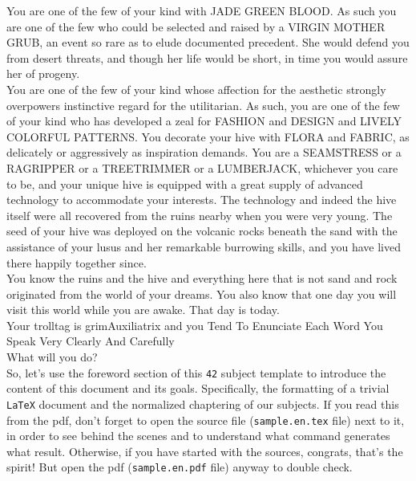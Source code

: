 \documentclass{42-en}
\begin{document}
    You are one of the few of your kind with JADE GREEN BLOOD.
    As such you are one of the few who could be selected and raised by a VIRGIN MOTHER GRUB,
    an event so rare as to elude documented precedent.
    She would defend you from desert threats,
    and though her life would be short,
    in time you would assure her of progeny.\\

    You are one of the few of your kind whose affection for the aesthetic strongly overpowers
    instinctive regard for the utilitarian.
    As such, you are one of the few of your kind who has developed a zeal for FASHION and DESIGN and LIVELY COLORFUL PATTERNS.
    You decorate your hive with FLORA and FABRIC, as delicately or aggressively as inspiration demands.
    You are a SEAMSTRESS or a RAGRIPPER or a TREETRIMMER or a LUMBERJACK, whichever you care to be,
    and your unique hive is equipped with a great supply of advanced technology to accommodate your interests.
    The technology and indeed the hive itself were all recovered from the ruins nearby when you were very young.
    The seed of your hive was deployed on the volcanic rocks beneath the sand with the assistance of your lusus
    and her remarkable burrowing skills, and you have lived there happily together since.\\

    You know the ruins and the hive and everything here that is not sand and rock originated from the world of your dreams.
    You also know that one day you will visit this world while you are awake. That day is today.\\

    Your trolltag is grimAuxiliatrix and you Tend To Enunciate Each Word You Speak Very Clearly And Carefully\\

    What will you do?\\

    So, let's use the foreword section of this \texttt{42} subject
    template to introduce the content of this document and
    its goals.
    Specifically, the formatting of a trivial
    \texttt{LaTeX} document and the normalized chaptering of our
    subjects. If you read this from the pdf, don't forget to open the
    source file (\texttt{sample.en.tex} file) next to it, in
    order to see behind the scenes and to understand what command
    generates what result. Otherwise, if you have started with the
    sources, congrats, that's the spirit! But open the pdf
    (\texttt{sample.en.pdf} file) anyway to double check.\\
\end{document}
